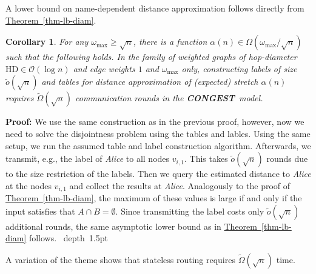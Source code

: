 \documentclass[letterpaper,11pt]{article}
\newcommand{\namedref}[2]{\hyperref[#2]{#1~\ref*{#2}}}
\newcommand{\theoremref}[1]{\namedref{Theorem}{#1}}
\newtheorem{corollary}[theorem]{Corollary}
\newcommand{\blackslug}{\hbox{\hskip 1pt \vrule width 4pt height 8pt
depth 1.5pt \hskip 1pt}}
\newcommand{\QED}{\quad\blackslug\lower 8.5pt\null\par}
\newenvironment{proof}[1][Proof:]{\noindent \textbf{#1}\xspace}{\QED}
\newcommand{\BO}{\mathcal{O}}
\newcommand{\CONGEST}{\textbf{CONGEST}}
\newcommand{\HD}{\mathrm{HD}}
\begin{document}
A lower bound on name-dependent distance approximation follows directly from
\theoremref{thm-lb-diam}.
\begin{corollary}\label{coro-lb2}
For any $\omega_{\max}\geq \sqrt{n}$, there is a function $\alpha(n)\in
\Omega(\omega_{\max}/\sqrt{n})$ such that the following holds. In the family of
weighted graphs of hop-diameter $\HD\in \BO(\log n)$ and edge weights $1$
and $\omega_{\max}$ only, constructing labels of size $\tilde{o}(\sqrt{n})$ and
tables for distance approximation of (expected) stretch $\alpha(n)$ requires
$\tilde\Omega(\sqrt n)$ communication rounds in the \CONGEST\ model.
\end{corollary}
\begin{proof}
We use the same construction as in the previous proof, however, now we need to
solve the disjointness problem using the tables and lables. Using the same
setup, we run the assumed table and label construction algorithm. Afterwards, we
transmit, e.g., the label of \emph{Alice} to all nodes $v_{i,1}$. This takes
$\tilde{o}(\sqrt{n})$ rounds due to the size restriction of the labels. Then we
query the estimated distance to \emph{Alice} at the nodes $v_{i,1}$ and collect
the results at \emph{Alice}. Analogously to the proof of \theoremref{thm-lb-diam},
the maximum of these values is large if and only if the input satisfies that
$A\cap B=\emptyset$. Since transmitting the label costs only
$\tilde{o}(\sqrt{n})$ additional rounds, the same asymptotic lower bound as in
\theoremref{thm-lb-diam} follows.
\end{proof}

A variation of the theme shows that stateless routing requires
$\tilde{\Omega}(\sqrt{n})$ time.
\end{document}
